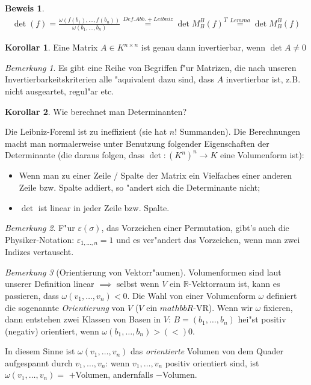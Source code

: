 \documentclass[oneside,fontsize=11pt,paper=a4,BCOR=0mm,DIV=12,automark,headsepline]{scrbook}
\theoremstyle{remark}
\theoremstyle{definition}
\newtheorem*{korollar}{Korollar}
\theoremstyle{definition}
\newtheorem*{prof}{Beweis}
\theoremstyle{remark}
\newtheorem*{bem}{Bemerkung}
\begin{document}
\begin{prof}
	\begin{align*}
	\det(f) = \frac{\omega(f(b_1),\dots,f(b_n))}{\omega(b_1,\dots,b_n)} \stackrel{Def. Abb. + Leibniz}{=} \det M^B_B(f)^T \stackrel{Lemma}{=} \det M_B^B(f)
	\end{align*}
\end{prof}
\begin{korollar}
	Eine Matrix \(A\in K^{n\times n} \) ist genau dann invertierbar, wenn \(\det A \neq 0 \)
\end{korollar}
\begin{bem}
	Es gibt eine Reihe von Begriffen f"ur Matrizen, die nach unseren Invertierbarkeitskriterien alle "aquivalent dazu sind, dass \(A \) invertierbar ist, z.B. nicht ausgeartet, regul"ar etc.
\end{bem}
\begin{korollar}
Wie berechnet man Determinanten?

Die Leibniz-Foreml ist zu ineffizient (sie hat \(n!\) Summanden). Die Berechnungen macht man normalerweise unter Benutzung folgender Eigenschaften der Determinante (die daraus folgen, dass \(\det : (K^n)^n \to K\) eine Volumenform ist):
\begin{itemize}
	\item Wenn man zu einer Zeile / Spalte der Matrix ein Vielfaches einer anderen Zeile bzw. Spalte addiert, so "andert sich die Determinante nicht;
	\item \(\det \) ist linear in jeder Zeile bzw. Spalte.
\end{itemize}
\end{korollar}
\begin{bem}
	F"ur \(\varepsilon(\sigma)\), das Vorzeichen einer Permutation, gibt's auch die Physiker-Notation: \(\varepsilon_{1,\dots,n}=1\) und es ver"andert das Vorzeichen, wenn man zwei Indizes vertauscht.
\end{bem}
\begin{bem}[Orientierung von Vektorr"aumen]
	Volumenformen sind laut unserer Definition linear \(\implies\) selbst wenn \(V\) ein \(\mathbb{R}\)-Vektorraum ist, kann es passieren, dass \(\omega(v_1,\dots,v_n)< 0\). Die Wahl von einer Volumenform \(\omega\) definiert die sogenannte \emph{Orientierung} von \(V\) (\(V\) ein \(mathbb{R}\)-VR). Wenn wir \(\omega\) fixieren, dann entstehen zwei Klassen von Basen in \(V\): \(B = (b_1,\dots,b_n)\) hei"st positiv (negativ) orientiert, wenn \(\omega(b_1,\dots,b_n) > (<) 0\). 
	
	In diesem Sinne ist \(\omega(v_1,\dots,v_n)\) das \emph{orientierte} Volumen von dem Quader aufgespannt durch \(v_1,\dots,v_n\): wenn \(v_1,\dots,v_n\) positiv orientiert sind, ist \(\omega(v_1,\dots,v_n) = \) \(+\)Volumen, andernfalls \(-\)Volumen.
\end{bem}
\end{document}
